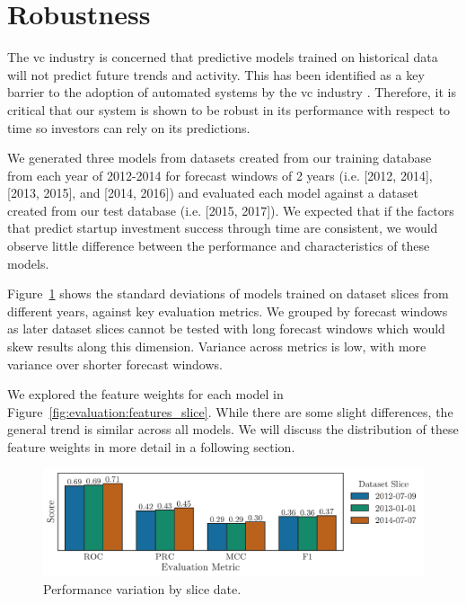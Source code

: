 \documentclass[../thesis/thesis.tex]{subfiles}
\begin{document}
\section{Robustness}

The \gls{vc} industry is concerned that predictive models trained on historical data will not predict future trends and activity. This  has been identified as a key barrier to the adoption of automated systems by the \gls{vc} industry \cite{stone2014}. Therefore, it is critical that our system is shown to be robust in its performance with respect to time so investors can rely on its predictions.

We generated three models from datasets created from our training database from each year of 2012-2014 for forecast windows of 2 years (i.e. [2012, 2014], [2013, 2015], and [2014, 2016]) and evaluated each model against a dataset created from our test database (i.e. [2015, 2017]). We expected that if the factors that predict startup investment success through time are consistent, we would observe little difference between the performance and characteristics of these models.

Figure~\ref{fig:evaluation:performance_slice} shows the standard deviations of models trained on dataset slices from different years, against key evaluation metrics. We grouped by forecast windows as later dataset slices cannot be tested with long forecast windows which would skew results along this dimension. Variance across metrics is low, with more variance over shorter forecast windows.

We explored the feature weights for each model in Figure~\ref{fig:evaluation:features_slice}. While there are some slight differences, the general trend is similar across all models. We will discuss the distribution of these feature weights in more detail in a following section.

\begin{figure}[!htb]
    \centering
    \includegraphics[width=\textwidth]{../figures/evaluation/performance_slice}
    \caption[Performance variation by slice date]{Performance variation by slice date.}
    \label{fig:evaluation:performance_slice}
\end{figure}
\end{document}
